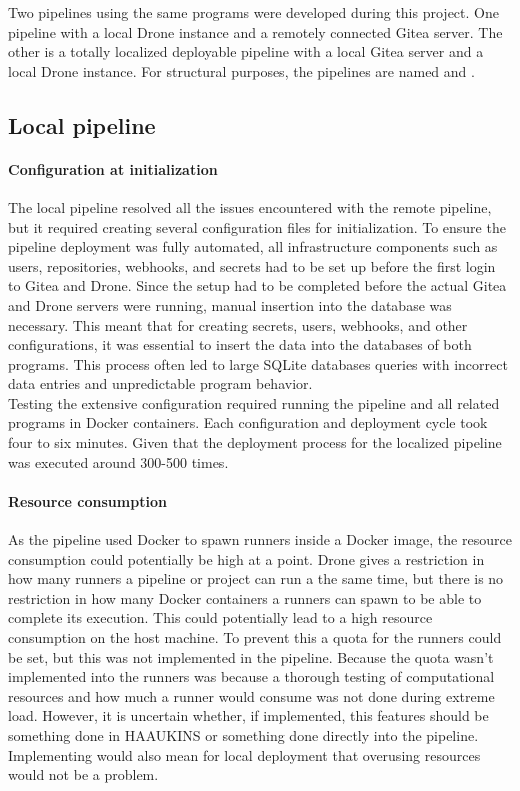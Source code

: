 Two pipelines using the same programs were developed during this project.
One pipeline with a local Drone instance and a remotely connected Gitea server.
The other is a totally localized deployable pipeline with a local Gitea server and a local Drone instance.
For structural purposes, the pipelines are named  and .

\subsection{Local pipeline}
\paragraph{Configuration at initialization}
The local pipeline resolved all the issues encountered with the remote pipeline, 
but it required creating several configuration files for initialization. To ensure the pipeline deployment was fully automated, 
all infrastructure components such as users, repositories, webhooks, and secrets had to be set up before the first login to Gitea and Drone.
Since the setup had to be completed before the actual Gitea and Drone servers were running, manual insertion into the database was necessary. 
This meant that for creating secrets, users, webhooks, and other configurations, 
it was essential to insert the data into the databases of both programs. 
This process often led to large SQLite databases queries with incorrect data entries and unpredictable program behavior.\\
Testing the extensive configuration required running the pipeline and all related programs in Docker containers. 
Each configuration and deployment cycle took four to six minutes. Given that the deployment process for the 
localized pipeline was executed around 300-500 times.
\paragraph{Resource consumption}
As the pipeline used Docker to spawn runners inside a Docker image, the resource consumption 
could potentially be high at a point. Drone gives a restriction in how many runners a pipeline or project 
can run a the same time, but there is no restriction in how many Docker containers a runners can spawn to be able to 
complete its execution. This could potentially lead to a high resource consumption on the host machine.
To prevent this a quota for the runners could be set, but this was not implemented in the pipeline.
Because the quota wasn't implemented into the runners was because a thorough testing of computational resources 
and how much a runner would consume was not done during extreme load. However, it is uncertain whether, if implemented, 
this features should be something done in \ac{HAAUKINS} or something done directly into the pipeline. Implementing
would also mean for local deployment that overusing resources would not be a problem.

